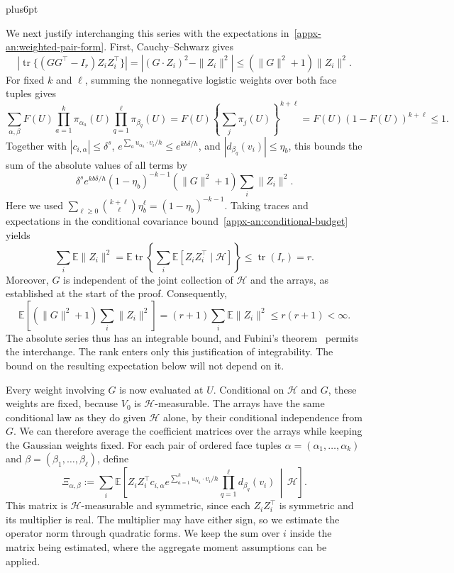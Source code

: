 \documentclass[11pt,letterpaper,twoside,leqno]{article}
\makeatletter
\theoremstyle{bookplain}
\theoremstyle{bookremark}
\renewenvironment{proof}[1][\proofname]{\par
  \pushQED{\qed}\normalfont\topsep6pt plus6pt\relax
  \trivlist\item[\hskip\labelsep\bfseries #1\@addpunct{.}]\ignorespaces
}{\popQED\endtrivlist\@endpefalse}
\newcommand{\E}{\mathbb E}
\newcommand{\tr}{\operatorname{tr}}
\makeatother
\begin{document}
\begin{proof}
We next justify interchanging this series with the expectations
in~\eqref{appx-an:weighted-pair-form}. First, Cauchy--Schwarz gives
\[
 \left|\tr\{(GG^\top-I_r)Z_iZ_i^\top\}\right|
 =\left|(G\cdot Z_i)^2-\|Z_i\|^2\right|
 \le(\|G\|^2+1)\|Z_i\|^2.
\]
For fixed $k$ and $\ell$, summing the nonnegative logistic
weights over both face tuples gives
\[
 \sum_{\alpha,\beta}F(U)
    \prod_{a=1}^k\pi_{\alpha_a}(U)
    \prod_{q=1}^\ell\pi_{\beta_q}(U)
 =F(U)\left\{\sum_j\pi_j(U)\right\}^{k+\ell}
 =F(U)(1-F(U))^{k+\ell}\le1.
\]
Together with $|c_{i,\alpha}|\le\delta^s$,
$e^{\sum_a u_{\alpha_a}\cdot v_i/h}\le e^{kb\delta/h}$,
and $|d_{\beta_q}(v_i)|\le\eta_b$, this bounds the sum of the
absolute values of all terms by
\[
 \delta^s e^{kb\delta/h}(1-\eta_b)^{-k-1}
       (\|G\|^2+1)\sum_i\|Z_i\|^2.
\]
Here we used
$\sum_{\ell\ge0}\binom{k+\ell}{\ell}\eta_b^\ell
=(1-\eta_b)^{-k-1}$.
Taking traces and expectations in the conditional covariance
bound~\eqref{appx-an:conditional-budget} yields
\[
 \sum_i\E\|Z_i\|^2
 =\E\tr\left\{\sum_i\E[Z_iZ_i^\top\mid\mathcal H]\right\}
 \le\tr(I_r)=r.
\]
Moreover, $G$ is independent of the joint collection of
$\mathcal H$ and the arrays, as established at the start of the
proof. Consequently,
\[
 \E\left[(\|G\|^2+1)\sum_i\|Z_i\|^2\right]
 =(r+1)\sum_i\E\|Z_i\|^2\le r(r+1)<\infty.
\]
The absolute series thus has an integrable bound, and Fubini's
theorem~\cite[Section~2.5]{Folland1999} permits the interchange.
The rank enters only this justification of integrability. The
bound on the resulting expectation below will not depend on it.

Every weight involving $G$ is now evaluated at $U$. Conditional
on $\mathcal H$ and $G$, these weights are fixed, because $V_0$
is $\mathcal H$-measurable. The arrays have the same conditional
law as they do given $\mathcal H$ alone, by their conditional
independence from $G$. We can therefore average the coefficient
matrices over the arrays while keeping the Gaussian weights
fixed. For each pair of ordered face tuples
$\alpha=(\alpha_1,\ldots,\alpha_k)$ and
$\beta=(\beta_1,\ldots,\beta_\ell)$, define
\[
 \Xi_{\alpha,\beta}:=\sum_i\E\left[
 Z_iZ_i^\top c_{i,\alpha}
 e^{\sum_{a=1}^k u_{\alpha_a}\cdot v_i/h}
 \prod_{q=1}^\ell d_{\beta_q}(v_i)
 \,\middle|\,\mathcal H\right].
\]
This matrix is $\mathcal H$-measurable and symmetric, since each
$Z_iZ_i^\top$ is symmetric and its multiplier is real. The
multiplier may have either sign, so we estimate the operator norm
through quadratic forms. We keep the sum over $i$ inside the
matrix being estimated, where the aggregate moment assumptions
can be applied.


\end{proof}
\end{document}
